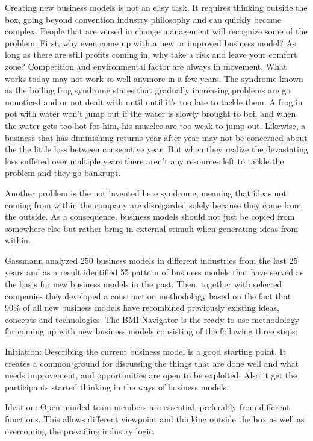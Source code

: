 		Creating new business models is not an easy task. It requires thinking outside the box, going beyond convention industry philosophy and can quickly become complex. People that are versed in change management will recognize some of the problem. First, why even come up with a new or improved business model? As long as there are still profits coming in, why take a risk and leave your comfort zone? Competition and environmental factor are always in movement. What works today may not work so well anymore in a few years. The syndrome known as the boiling frog syndrome states that gradually increasing problems are go unnoticed and or not dealt with until until it's too late to tackle them. A frog in pot with water won't jump out if the water is slowly brought to boil and when the water gets too hot for him, his muscles are too weak to jump out. Likewise, a business that has diminishing returns year after year may not be concerned about the the little loss between consecutive year. But when they realize the devastating loss suffered over multiple years there aren't any resources left to tackle the problem and they go bankrupt.

		Another problem is the not invented here syndrome, meaning that ideas not coming from within the company are disregarded solely because they come from the outside. As a consequence, business models should not just be copied from somewhere else but rather bring in external stimuli when generating ideas from within.

		Gassmann analyzed 250 business models in different industries from the last 25 years and as a result identified 55 pattern of business models that have served as the basis for new business models in the past. Then, together with selected companies they developed a construction methodology based on the fact that 90\% of all new business models have recombined previously existing ideas, concepts and  technologies. The BMI Navigator is the ready-to-use methodology for coming up with new business models consisting of the following three steps:
					
		Initiation: Describing the current business model is a good starting point. It creates a common ground for discussing the things that are done well and what needs improvement, and opportunities are open to be exploited. Also it get the participants started thinking in the ways of business models.

		Ideation: Open-minded team members are essential, preferably from different functions. This allows different viewpoint and thinking outside the box as well as overcoming the prevailing industry logic.
		
